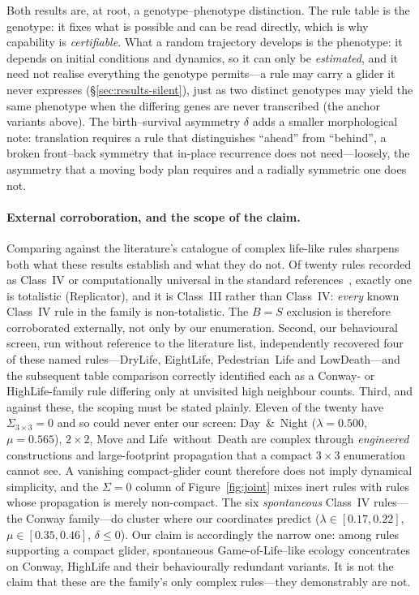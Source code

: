 \documentclass{article}
\begin{document}
Both results are, at root, a genotype--phenotype distinction. The rule table is
the genotype: it fixes what is possible and can be read directly, which is why
capability is \emph{certifiable}. What a random trajectory develops is the
phenotype: it depends on initial conditions and dynamics, so it can only be
\emph{estimated}, and it need not realise everything the genotype permits---a rule
may carry a glider it never expresses (\S\ref{sec:results-silent}), just as two
distinct genotypes may yield the same phenotype when the differing genes are never
transcribed (the anchor variants above). The birth--survival asymmetry $\delta$
adds a smaller morphological note: translation requires a rule that distinguishes
``ahead'' from ``behind'', a broken front--back symmetry that in-place recurrence
does not need---loosely, the asymmetry that a moving body plan requires and a
radially symmetric one does not.

\paragraph{External corroboration, and the scope of the claim.}
Comparing against the literature's catalogue of complex life-like rules sharpens
both what these results establish and what they do not. Of twenty rules recorded
as Class~IV or computationally universal in the standard
references~\cite{eppstein2010,adamatzky2010}, exactly one is totalistic
(Replicator), and it is Class~III rather than Class~IV: \emph{every} known
Class~IV rule in the family is non-totalistic. The $B=S$ exclusion is therefore
corroborated externally, not only by our enumeration. Second, our behavioural
screen, run without reference to the literature list, independently recovered four
of these named rules---DryLife, EightLife, Pedestrian~Life and LowDeath---and the
subsequent table comparison correctly identified each as a Conway- or
HighLife-family rule differing only at unvisited high neighbour counts. Third, and
against these, the scoping must be stated plainly. Eleven of the twenty have
$\Sigma_{3\times3}=0$ and so could never enter our screen: Day~\&~Night
($\lambda=0.500$, $\mu=0.565$), $2{\times}2$, Move and Life~without~Death are
complex through \emph{engineered} constructions and large-footprint propagation
that a compact $3{\times}3$ enumeration cannot see. A vanishing compact-glider
count therefore does not imply dynamical simplicity, and the $\Sigma=0$ column of
Figure~\ref{fig:joint} mixes inert rules with rules whose propagation is merely
non-compact. The six \emph{spontaneous} Class~IV rules---the Conway family---do
cluster where our coordinates predict ($\lambda\in[0.17,0.22]$,
$\mu\in[0.35,0.46]$, $\delta\le0$). Our claim is accordingly the narrow one: among
rules supporting a compact glider, spontaneous Game-of-Life--like ecology
concentrates on Conway, HighLife and their behaviourally redundant variants. It is
not the claim that these are the family's only complex rules---they demonstrably
are not.
\end{document}
